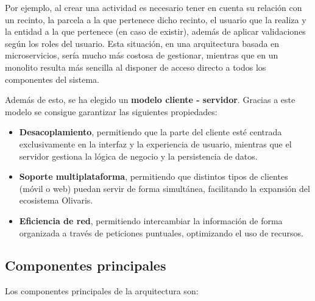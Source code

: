 Por ejemplo, al crear una actividad es necesario tener en cuenta su relación con un recinto, la parcela a la que pertenece dicho recinto, el usuario que la realiza y la entidad a la que pertenece (en caso de existir),
además de aplicar validaciones según los roles del usuario. Esta situación, en una arquitectura basada en microservicios, sería mucho más costosa de gestionar, mientras que en un monolito resulta más sencilla al
disponer de acceso directo a todos los componentes del sistema.

Además de esto, se ha elegido un \textbf{modelo cliente - servidor}. Gracias a este modelo se consigue garantizar las siguientes propiedades:

\begin{itemize}
    \item \textbf{Desacoplamiento}, permitiendo que la parte del cliente esté centrada exclusivamente en la interfaz y la experiencia de usuario, mientras que el servidor gestiona la lógica de negocio y la persistencia
    de datos.

    \item \textbf{Soporte multiplataforma}, permitiendo que distintos tipos de clientes (móvil o web) puedan servir de forma simultánea, facilitando la expansión del ecosistema Olivaris.
    
    \item \textbf{Eficiencia de red}, permitiendo intercambiar la información de forma organizada a través de peticiones puntuales, optimizando el uso de recursos. 
\end{itemize}

\subsection{Componentes principales}

Los componentes principales de la arquitectura son:

